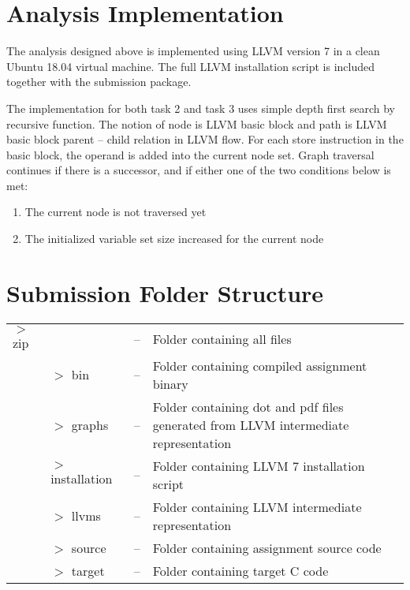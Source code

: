 \documentclass[11pt,a4paper,fleqn]{article}
\begin{document}
   \section{Analysis Implementation}

   The analysis designed above is implemented using LLVM version 7 in a clean Ubuntu 18.04 virtual machine. 
   The full LLVM installation script is included together with the submission package.
   
   The implementation for both task 2 and task 3 uses simple depth first search by recursive function. 
   The notion of node is LLVM basic block and path is LLVM basic block parent – child relation in LLVM flow. 
   For each store instruction in the basic block, the operand is added into the current node set. 
   Graph traversal continues if there is a successor, and if either one of the two conditions below is met:

   \begin{enumerate}
      \item The current node is not traversed yet
      \item The initialized variable set size increased for the current node
   \end{enumerate}

   \section{Submission Folder Structure}

   \begin{tabularx}{\linewidth}{l l l X}
      $>$ zip  &                    & -- & Folder containing all files                   \\
               & $>$ bin            & -- & Folder containing compiled assignment binary  \\
               & $>$ graphs         & -- & Folder containing dot and pdf files generated from LLVM intermediate representation  \\
               & $>$ installation   & -- & Folder containing LLVM 7 installation script \\
               & $>$ llvms          & -- & Folder containing LLVM intermediate representation  \\
               & $>$ source         & -- & Folder containing assignment source code  \\
               & $>$ target         & -- & Folder containing target C code  \\
   \end{tabularx}
\end{document}
